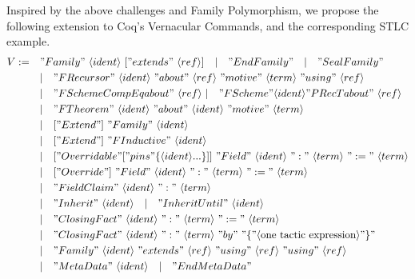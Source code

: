 
\newpage




Inspired by the above challenges and Family Polymorphism, we propose
the following extension to Coq's Vernacular Commands, and the corresponding STLC example.
\begin{align*}
  V := \quad &"Family"~\langle ident\rangle~["extends"~\langle ref\rangle] 
  \quad |\quad "EndFamily" \quad | \quad "SealFamily" \\
  & |\quad "FRecursor"~\langle ident\rangle~"about"~\langle ref\rangle~"motive"~\langle term\rangle~"using"~\langle ref\rangle \\
  & |\quad "FScheme CompEq about"~\langle ref \rangle~|\quad "FScheme " \langle ident\rangle " PRecT about"~\langle ref \rangle\\
  & | \quad "FTheorem"~\langle ident\rangle~"about"~\langle ident\rangle~"motive"~\langle term\rangle \\
  & |\quad ["Extend"]~"Family"~\langle ident\rangle \\ 
  & |\quad ["Extend"]~"FInductive"~\langle ident\rangle \\ 
  & |\quad ["Overridable " ["pins " \{ \langle ident\rangle ... \}]]~"Field"~\langle ident\rangle~":"~\langle term \rangle~":="~\langle term \rangle \\
  & |\quad ["Override"]~"Field"~\langle ident\rangle~":"~\langle term \rangle~":="~\langle term \rangle \\
  & | \quad "FieldClaim"~\langle ident\rangle~":"~\langle term \rangle \\
  & | \quad "Inherit"~\langle ident\rangle \quad | \quad "Inherit Until"~\langle ident\rangle \quad \\
  & | \quad "Closing Fact"~\langle ident\rangle~":"~\langle term \rangle~":="~\langle term \rangle \\ 
  & | \quad "Closing Fact"~\langle ident\rangle~":"~\langle term \rangle~"by"~"\{"\langle \text{one tactic expression}\rangle"\}" \\ 
  & | \quad "Family"~\langle ident\rangle~"extends"~\langle ref\rangle~"using"~\langle ref\rangle~"using"~\langle ref\rangle \\ 
  & | \quad "MetaData"~\langle ident\rangle \quad | \quad "EndMetaData" \\ 
\end{align*}

